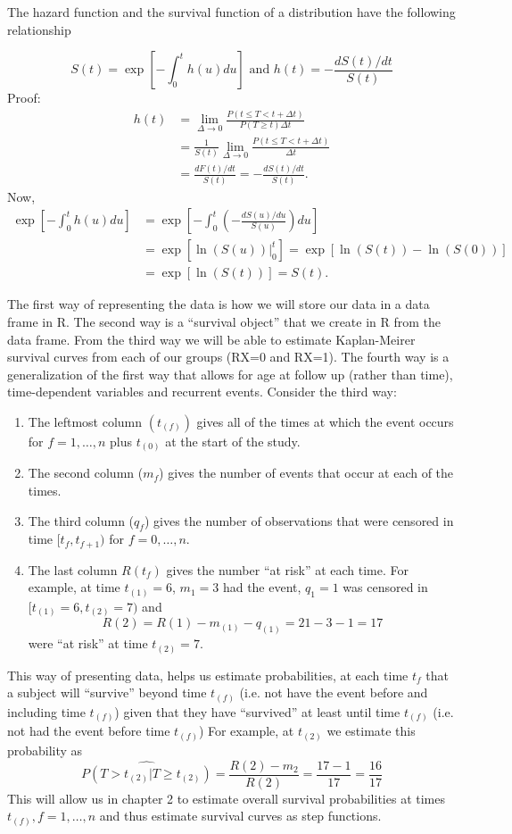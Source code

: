 \documentclass{article}
\begin{document}
 The hazard function and the survival function of a distribution have the following relationship

\[ S(t) = \exp\left[-\int_0^t h(u) du\right] \text{ and } h(t) = -\frac{d S(t)/dt}{S(t)}
\]
Proof:
\begin{align*} h(t) & = \lim_{\Delta \rightarrow 0} \frac{P(t \le T < t + \Delta t)} {P(T \ge t) \Delta t} \\
& = \frac{1}{S(t)} \lim_{\Delta \rightarrow 0} \frac{P(t \le T < t + \Delta t)} {\Delta t} \\
& = \frac{dF(t)/dt}{S(t)} = -\frac{d S(t)/dt}{S(t)}.
\end{align*}
Now,
\begin{align*}
\exp\left[-\int_0^t h(u) du\right] & = \exp\left[-\int_0^t \left(-\frac{dS(u)/du}{S(u)} \right)du\right] \\
&= \exp\left[\ln (S(u)) |_0^t \right] = \exp\left[\ln(S(t)) - \ln(S(0))\right] \\
& = \exp\left[\ln(S(t))\right] = S(t).
\end{align*}

 The first way of representing the data is how we will store our data in a data frame in R. The second way is a ``survival object'' that we create in R from the data frame. From the third way we will be able to estimate Kaplan-Meirer survival curves from each of our groups (RX=0 and RX=1). The fourth way is a generalization of the first way that allows for age at follow up (rather than time), time-dependent variables and recurrent events. Consider the third way:
\begin{enumerate}[ ]
\item The leftmost column $(t_{(f)})$ gives all of the times at which the event occurs for $f=1,\ldots,n$ plus $t_{(0)}$ at the start of the study.
\item The second column ($m_f$) gives the number of events that occur at each of the times.
\item The third column ($q_f$) gives the number of observations that were censored in time $[t_f,t_{f+1})$ for $f=0,\ldots,n$.
\item The last column $R(t_f)$ gives the number ``at risk'' at each time. For example, at time $t_{(1)}=6$, $m_{1}=3$ had the event, $q_{1}=1$ was censored in $[t_{(1)}=6, t_{(2)}=7)$ and
    \[
    R(2)=R(1)-m_{(1)}-q_{(1)}=21-3-1=17
    \]
     were ``at risk'' at time $t_{(2)}=7$.
\end{enumerate}
This way of presenting data, helps us estimate probabilities, at each time $t_{f}$ that a subject will ``survive'' beyond time $t_{(f)}$ (i.e. not have the event before and including time $t_{(f)}$) given that they have ``survived'' at least until time $t_{(f)}$ (i.e. not had the event before time $t_{(f)}$)  For example, at $t_{(2)}$ we estimate this probability as
\[ \widehat{P(T>t_{(2)}| T \ge t_{(2)})} =  \dfrac{R(2)-m_2}{R{(2)}} = \dfrac{17-1}{17} = \dfrac{16}{17}
\]
This will allow us in chapter 2 to estimate overall survival probabilities at times $t_{(f)}, f=1,\ldots,n$ and thus estimate survival curves as step functions.
\end{document}
